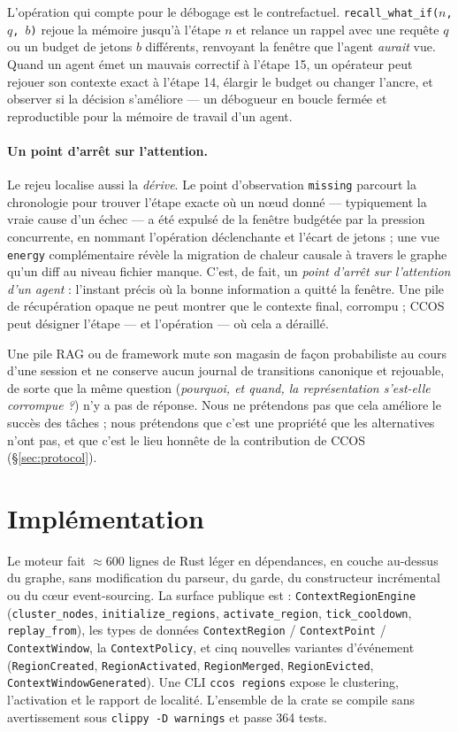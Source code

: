 \documentclass[11pt]{article}
\newcommand{\code}[1]{\texttt{#1}}
\begin{document}
L'opération qui compte pour le débogage est le contrefactuel.
\code{recall\_what\_if($n$, $q$, $b$)} rejoue la mémoire jusqu'à l'étape $n$ et
relance un rappel avec une requête $q$ ou un budget de jetons $b$ différents,
renvoyant la fenêtre que l'agent \emph{aurait} vue. Quand un agent émet un mauvais
correctif à l'étape 15, un opérateur peut rejouer son contexte exact à l'étape 14,
élargir le budget ou changer l'ancre, et observer si la décision s'améliore --- un
débogueur en boucle fermée et reproductible pour la mémoire de travail d'un agent.

\paragraph{Un point d'arrêt sur l'attention.} Le rejeu localise aussi la
\emph{dérive}. Le point d'observation \code{missing} parcourt la chronologie pour
trouver l'étape exacte où un nœud donné --- typiquement la vraie cause d'un échec ---
a été expulsé de la fenêtre budgétée par la pression concurrente, en nommant
l'opération déclenchante et l'écart de jetons ; une vue \code{energy} complémentaire
révèle la migration de chaleur causale à travers le graphe qu'un diff au niveau
fichier manque. C'est, de fait, un \emph{point d'arrêt sur l'attention d'un agent} :
l'instant précis où la bonne information a quitté la fenêtre. Une pile de récupération
opaque ne peut montrer que le contexte final, corrompu ; CCOS peut désigner l'étape
--- et l'opération --- où cela a déraillé.

Une pile RAG ou de framework mute son magasin de façon probabiliste au cours d'une
session et ne conserve aucun journal de transitions canonique et rejouable, de sorte
que la même question (\emph{pourquoi, et quand, la représentation s'est-elle
corrompue ?}) n'y a pas de réponse. Nous ne prétendons pas que cela améliore le
succès des tâches ; nous prétendons que c'est une propriété que les alternatives
n'ont pas, et que c'est le lieu honnête de la contribution de CCOS
(\S\ref{sec:protocol}).

\section{Implémentation}\label{sec:impl}

Le moteur fait $\approx\!600$ lignes de Rust léger en dépendances, en couche au-dessus
du graphe, sans modification du parseur, du garde, du constructeur incrémental ou du
cœur event-sourcing. La surface publique est : \code{ContextRegionEngine}
(\code{cluster\_nodes}, \code{initialize\_regions}, \code{activate\_region},
\code{tick\_cooldown}, \code{replay\_from}), les types de données \code{ContextRegion}
/ \code{ContextPoint} / \code{ContextWindow}, la \code{ContextPolicy}, et cinq
nouvelles variantes d'événement (\code{RegionCreated}, \code{RegionActivated},
\code{RegionMerged}, \code{RegionEvicted}, \code{ContextWindowGenerated}). Une CLI
\code{ccos regions} expose le clustering, l'activation et le rapport de localité.
L'ensemble de la crate se compile sans avertissement sous \code{clippy -D warnings}
et passe 364 tests.
\end{document}
